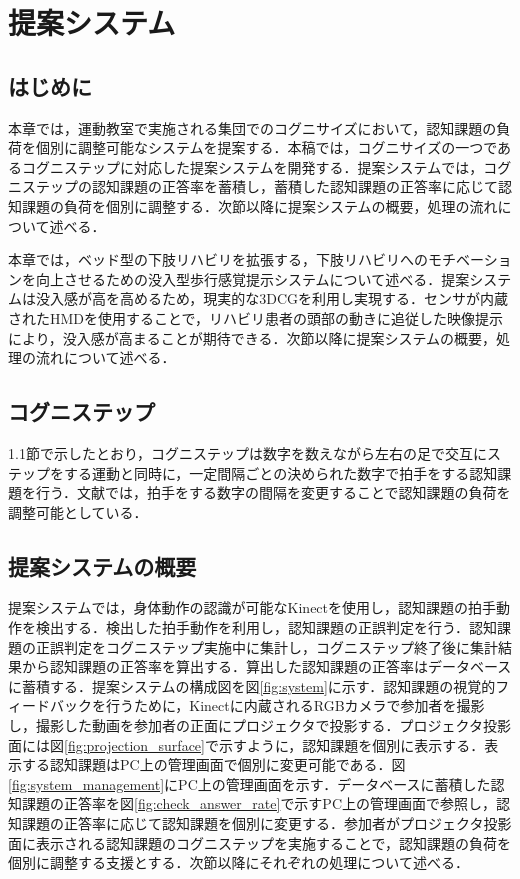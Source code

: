 \chapter{提案システム}

\thispagestyle{myheadings}

\section{はじめに}
本章では，運動教室で実施される集団でのコグニサイズにおいて，認知課題の負荷を個別に調整可能なシステムを提案する．本稿では，コグニサイズの一つであるコグニステップに対応した提案システムを開発する．提案システムでは，コグニステップの認知課題の正答率を蓄積し，蓄積した認知課題の正答率に応じて認知課題の負荷を個別に調整する．次節以降に提案システムの概要，処理の流れについて述べる．

本章では，ベッド型の下肢リハビリを拡張する，下肢リハビリへのモチベーションを向上させるための没入型歩行感覚提示システムについて述べる．提案システムは没入感が高を高めるため，現実的な3DCGを利用し実現する．センサが内蔵されたHMDを使用することで，リハビリ患者の頭部の動きに追従した映像提示により，没入感が高まることが期待できる．次節以降に提案システムの概要，処理の流れについて述べる．
\fi

\section{コグニステップ}
1.1節で示したとおり，コグニステップは数字を数えながら左右の足で交互にステップをする運動と同時に，一定間隔ごとの決められた数字で拍手をする認知課題を行う．文献\cite{認知症予防へ向けた運動コグニサイズ}では，拍手をする数字の間隔を変更することで認知課題の負荷を調整可能としている．

\section{提案システムの概要}
提案システムでは，身体動作の認識が可能なKinectを使用し，認知課題の拍手動作を検出する．検出した拍手動作を利用し，認知課題の正誤判定を行う．認知課題の正誤判定をコグニステップ実施中に集計し，コグニステップ終了後に集計結果から認知課題の正答率を算出する．算出した認知課題の正答率はデータベースに蓄積する．提案システムの構成図を図\ref{fig:system}に示す．認知課題の視覚的フィードバックを行うために，Kinectに内蔵されるRGBカメラで参加者を撮影し，撮影した動画を参加者の正面にプロジェクタで投影する．プロジェクタ投影面には図\ref{fig:projection_surface}で示すように，認知課題を個別に表示する．表示する認知課題はPC上の管理画面で個別に変更可能である．図\ref{fig:system_management}にPC上の管理画面を示す．データベースに蓄積した認知課題の正答率を図\ref{fig:check_answer_rate}で示すPC上の管理画面で参照し，認知課題の正答率に応じて認知課題を個別に変更する．参加者がプロジェクタ投影面に表示される認知課題のコグニステップを実施することで，認知課題の負荷を個別に調整する支援とする．次節以降にそれぞれの処理について述べる．


